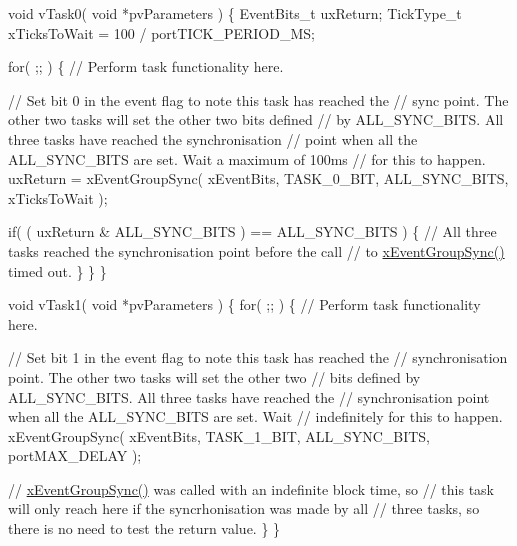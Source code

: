 \begin{DoxyPre}void vTask0( void *pvParameters )
\{
EventBits\_t uxReturn;
TickType\_t xTicksToWait = 100 / portTICK\_PERIOD\_MS;\end{DoxyPre}



\begin{DoxyPre}    for( ;; )
    \{
    // Perform task functionality here.\end{DoxyPre}



\begin{DoxyPre}    // Set bit 0 in the event flag to note this task has reached the
    // sync point.  The other two tasks will set the other two bits defined
    // by ALL\_SYNC\_BITS.  All three tasks have reached the synchronisation
    // point when all the ALL\_SYNC\_BITS are set.  Wait a maximum of 100ms
    // for this to happen.
    uxReturn = xEventGroupSync( xEventBits, TASK\_0\_BIT, ALL\_SYNC\_BITS, xTicksToWait );\end{DoxyPre}



\begin{DoxyPre}    if( ( uxReturn \& ALL\_SYNC\_BITS ) == ALL\_SYNC\_BITS )
    \{
        // All three tasks reached the synchronisation point before the call
        // to \mbox{\hyperlink{event__groups_8h_a869511456b86426f52e2eec898bff341}{xEventGroupSync()}} timed out.
    \}
   \}
\}\end{DoxyPre}



\begin{DoxyPre}void vTask1( void *pvParameters )
\{
    for( ;; )
    \{
    // Perform task functionality here.\end{DoxyPre}



\begin{DoxyPre}    // Set bit 1 in the event flag to note this task has reached the
    // synchronisation point.  The other two tasks will set the other two
    // bits defined by ALL\_SYNC\_BITS.  All three tasks have reached the
    // synchronisation point when all the ALL\_SYNC\_BITS are set.  Wait
    // indefinitely for this to happen.
    xEventGroupSync( xEventBits, TASK\_1\_BIT, ALL\_SYNC\_BITS, portMAX\_DELAY );\end{DoxyPre}



\begin{DoxyPre}    // \mbox{\hyperlink{event__groups_8h_a869511456b86426f52e2eec898bff341}{xEventGroupSync()}} was called with an indefinite block time, so
    // this task will only reach here if the syncrhonisation was made by all
    // three tasks, so there is no need to test the return value.
    \}
\}\end{DoxyPre}



